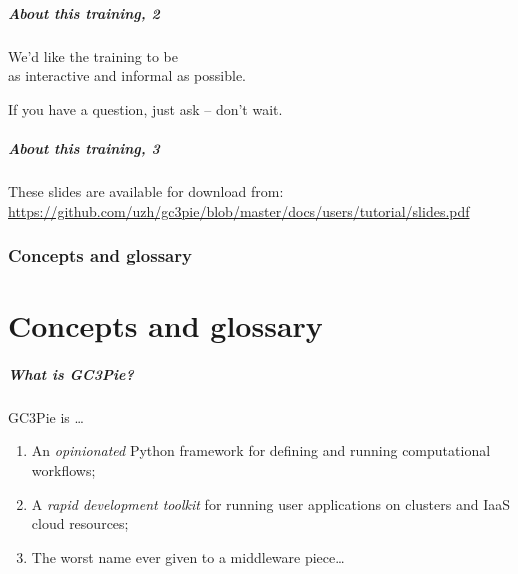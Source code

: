 \documentclass[english,serif,mathserif,usenames,dvipsnames]{beamer}
\begin{document}
\begin{frame}
  \frametitle{About this training, 2}
  \begin{center}
    We'd like the training to be \\ as interactive and informal as possible.

    \+ If you have a question, just ask -- don't wait.
  \end{center}
\end{frame}


\begin{frame}[fragile]
  \frametitle{About this training, 3}
  \begin{center}
    These slides are available for download from:
    \url{https://github.com/uzh/gc3pie/blob/master/docs/users/tutorial/slides.pdf}
  \end{center}
\end{frame}


\section{Concepts and glossary}
\part{Concepts and glossary}

\begin{frame}
  \frametitle{What is GC3Pie?}
  GC3Pie is \ldots
  \begin{enumerate}
  \item \alert<2>{An \emph{opinionated} Python framework for defining and running computational workflows;}
  \item \alert<1>{A \emph{rapid development toolkit} for running user applications on clusters and IaaS cloud resources;}
  \item The worst name ever given to a middleware piece\ldots
  \end{enumerate}

  \+
\end{frame}
\end{document}
